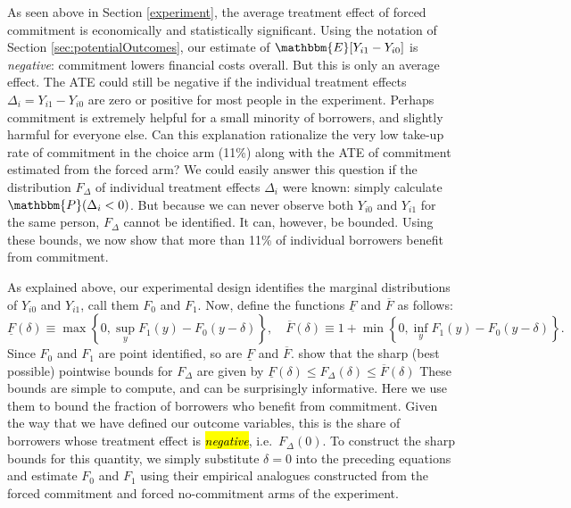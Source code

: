 \documentclass[oneside,11pt]{article}
\begin{document}
As seen above in Section \ref{experiment}, the average treatment effect of forced commitment is economically and statistically significant. 
Using the notation of Section \ref{sec:potentialOutcomes}, our estimate of $\mathbbm{E}[Y_{i1} - Y_{i0}]$ is \emph{negative}: commitment lowers financial costs overall. 
But this is only an average effect.
The ATE could still be negative if the individual treatment effects $\Delta_i = Y_{i1} - Y_{i0}$ are zero or positive for most people in the experiment.
Perhaps commitment is extremely helpful for a small minority of borrowers, and slightly harmful for everyone else.
Can this explanation rationalize the very low take-up rate of commitment in the choice arm (11\%) along with the ATE of commitment estimated from the forced arm? 
We could easily answer this question if the distribution $F_\Delta$ of individual treatment effects $\Delta_i$ were known: simply calculate $\mathbbm{P}(\Delta_i < 0)$.
But because we can never observe both $Y_{i0}$ and $Y_{i1}$ for the same person, $F_\Delta$ cannot be identified. 
It can, however, be bounded. 
Using these bounds, we now show that more than 11\% of individual borrowers benefit from commitment.

As explained above, our experimental design identifies the marginal distributions of $Y_{i0}$ and $Y_{i1}$, call them $F_0$ and $F_1$.
Now, define the functions $\underline{F}$ and $\overline{F}$ as follows:
\[
\underline{F}(\delta) \equiv \max \left\{0, \sup_y F_1(y) - F_0(y - \delta)  \right\}, \quad
\overline{F}(\delta) \equiv 1 + \min \left\{0, \inf_y F_1(y) - F_0(y-\delta) \right\}.
\]
Since $F_0$ and $F_1$ are point identified, so are $\underline{F}$ and $\overline{F}$.
\cite{fan2010sharp} show that the sharp (best possible) pointwise bounds for $F_\Delta$ are given by $\underline{F}(\delta) \leq F_\Delta(\delta) \leq \overline{F}(\delta)$
These bounds are simple to compute, and can be surprisingly informative. 
Here we use them to bound the fraction of borrowers who benefit from commitment. 
Given the way that we have defined our outcome variables, this is the share of borrowers whose treatment effect is \hl{\emph{negative}}, i.e.\ $F_\Delta(0)$. 
To construct the sharp bounds for this quantity, we simply substitute $\delta = 0$ into the preceding equations and estimate $F_0$ and $F_1$ using their empirical analogues constructed from the forced commitment and forced no-commitment arms of the experiment.

\end{document}
